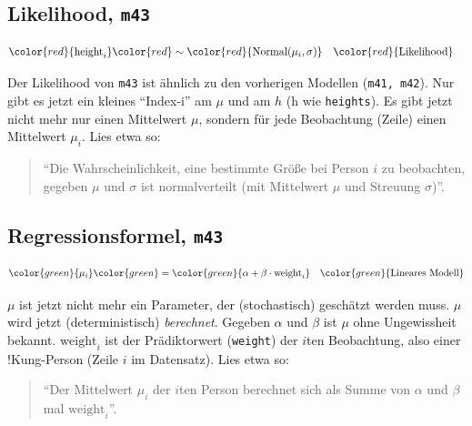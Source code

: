 \documentclass[
  a4paper,
  DIV=11]{scrreprt}
\theoremstyle{definition}
\theoremstyle{remark}
\begin{document}
\hypertarget{likelihood-m43}{%
\subsection{\texorpdfstring{Likelihood,
\texttt{m43}}{Likelihood, m43}}\label{likelihood-m43}}

\[
\begin{aligned}
\color{red}{\text{height}_i} & \color{red}\sim \color{red}{\operatorname{Normal}(\mu_i, \sigma)} && \color{red}{\text{Likelihood}}
\end{aligned}
\]

Der Likelihood von \texttt{m43} ist ähnlich zu den vorherigen Modellen
(\texttt{m41,\ m42}). Nur gibt es jetzt ein kleines ``Index-i'' am
\(\mu\) und am \(h\) (h wie \texttt{heights}). Es gibt jetzt nicht mehr
nur einen Mittelwert \(\mu\), sondern für jede Beobachtung (Zeile) einen
Mittelwert \(\mu_i\). Lies etwa so:

\begin{quote}
``Die Wahrscheinlichkeit, eine bestimmte Größe bei Person \(i\) zu
beobachten, gegeben \(\mu\) und \(\sigma\) ist normalverteilt (mit
Mittelwert \(\mu\) und Streuung \(\sigma\))''.
\end{quote}

\hypertarget{regressionsformel-m43}{%
\subsection{\texorpdfstring{Regressionsformel,
\texttt{m43}}{Regressionsformel, m43}}\label{regressionsformel-m43}}

\[
\begin{aligned}
\color{green}{\mu_i} & \color{green}= \color{green}{\alpha + \beta\cdot \text{weight}_i}  && \color{green}{\text{Lineares Modell} } \\
\end{aligned}
\]

\(\mu\) ist jetzt nicht mehr ein Parameter, der (stochastisch) geschätzt
werden muss. \(\mu\) wird jetzt (deterministisch) \emph{berechnet}.
Gegeben \(\alpha\) und \(\beta\) ist \(\mu\) ohne Ungewissheit bekannt.
\(\text{weight}_i\) ist der Prädiktorwert (\texttt{weight}) der \(i\)ten
Beobachtung, also einer !Kung-Person (Zeile \(i\) im Datensatz). Lies
etwa so:

\begin{quote}
``Der Mittelwert \(\mu_i\) der \(i\)ten Person berechnet sich als Summe
von \(\alpha\) und \(\beta\) mal \(\text{weight}_i\)''.
\end{quote}
\end{document}
